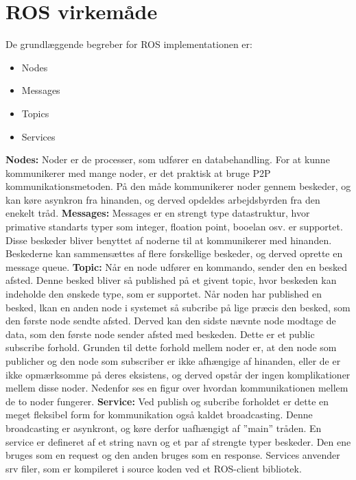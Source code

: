 \section{ROS virkemåde}
De grundlæggende begreber for ROS implementationen er:
\begin{itemize}  
\item Nodes
\item Messages
\item Topics
\item Services
\end{itemize}
\textbf{Nodes:} Noder er de processer, som udfører en databehandling. For at kunne kommunikerer med mange noder, er det praktisk at bruge P2P kommunikationsmetoden. På den måde kommunikerer noder gennem beskeder, og kan køre asynkron fra hinanden, og derved opdeldes arbejdsbyrden fra den enekelt tråd.\newline
\newline
\textbf{Messages:} Messages er en strengt type datastruktur, hvor primative standarts typer som integer, floation point, booelan osv. er supportet. Disse beskeder bliver benyttet af noderne til at kommunikerer med hinanden. Beskederne kan sammensættes af flere forskellige beskeder, og derved oprette en message queue.\newline
\newline
\textbf{Topic:} Når en node udfører en kommando, sender den en besked afsted. Denne besked bliver så published på et givent topic, hvor beskeden kan indeholde den ønskede type, som er supportet. Når noden har published en besked, lkan en anden node i systemet så subcribe på lige præcis den besked, som den første node sendte afsted. Derved kan den sidste nævnte node modtage de data, som den første node sender afsted med beskeden. Dette er et public subscribe forhold. Grunden til dette forhold mellem noder er, at den node som publicher og den node som subscriber er ikke afhængige af hinanden, eller de er ikke opmærksomme på deres eksistens, og derved opstår der ingen komplikationer mellem disse noder.\newline
Nedenfor ses en figur over hvordan kommunikationen mellem de to noder fungerer.
\textbf{Service:} Ved publish og subcribe forholdet er dette en meget fleksibel form for kommunikation også kaldet broadcasting. Denne broadcasting er asynkront, og køre derfor uafhængigt af ''main'' tråden. En service er defineret af et string navn og et par af strengte typer beskeder. Den ene bruges som en request og den anden bruges som en response. Services anvender srv filer, som er kompileret i source koden ved et ROS-client bibliotek.
